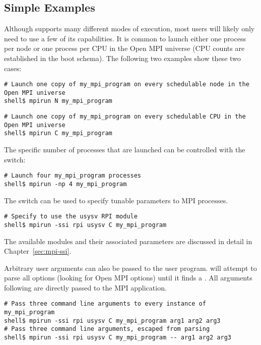 \subsection{Simple Examples}

Although  supports many different modes of execution, most
users will likely only need to use a few of its capabilities.  It is
common to launch either one process per node or one process per CPU in
the Open MPI universe (CPU counts are established in the boot schema).  The
following two examples show these two cases:

\lstset{style=lam-cmdline}
\begin{lstlisting}
# Launch one copy of my_mpi_program on every schedulable node in the Open MPI universe
shell$ mpirun N my_mpi_program
\end{lstlisting}

\lstset{style=lam-cmdline}
\begin{lstlisting}
# Launch one copy of my_mpi_program on every schedulable CPU in the Open MPI universe
shell$ mpirun C my_mpi_program
\end{lstlisting}

The specific number of processes that are launched can be controlled
with the  switch:

\lstset{style=lam-cmdline}
\begin{lstlisting}
# Launch four my_mpi_program processes
shell$ mpirun -np 4 my_mpi_program
\end{lstlisting}

The  switch can be used to specify tunable parameters to
MPI processes.

\lstset{style=lam-cmdline}
\begin{lstlisting}
# Specify to use the usysv RPI module
shell$ mpirun -ssi rpi usysv C my_mpi_program
\end{lstlisting}

The available modules and their associated parameters are discussed in
detail in Chapter~\ref{sec:mpi-ssi}.

Arbitrary user arguments can also be passed to the user program.
 will attempt to parse all options (looking for Open MPI
options) until it finds a \cmdarg{--}.  All arguments following
\cmdarg{--} are directly passed to the MPI application.

\lstset{style=lam-cmdline}
\begin{lstlisting}
# Pass three command line arguments to every instance of my_mpi_program
shell$ mpirun -ssi rpi usysv C my_mpi_program arg1 arg2 arg3
# Pass three command line arguments, escaped from parsing
shell$ mpirun -ssi rpi usysv C my_mpi_program -- arg1 arg2 arg3
\end{lstlisting}

